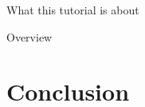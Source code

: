\documentclass[t,aspectratio=169]{beamer}
\begin{document}
\begin{frame}{What this tutorial is about}
\begin{minipage}[t]{0.25\linewidth}

\end{minipage}

\end{frame}


\begin{frame}{Overview}
\tableofcontents
\end{frame}









%


\section*{Conclusion}
\end{document}
